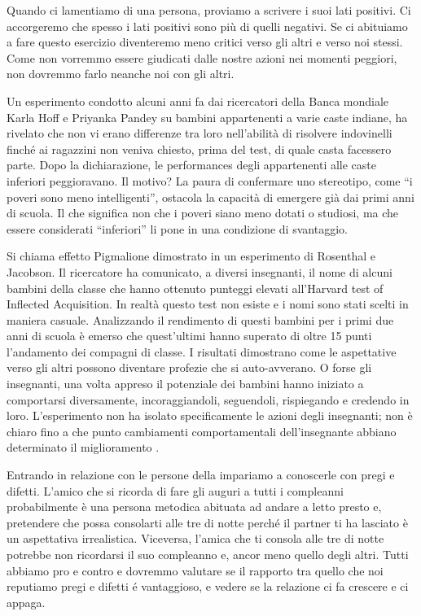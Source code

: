 \documentclass[12pt]{book} %
\begin{document}
Quando ci lamentiamo di una persona, proviamo a scrivere i suoi lati positivi. Ci accorgeremo che spesso i lati positivi
sono più di quelli negativi. Se ci abituiamo a fare questo esercizio diventeremo meno critici verso gli altri e verso
noi stessi. Come non vorremmo essere giudicati dalle nostre azioni nei momenti peggiori, non dovremmo farlo neanche noi
con gli altri.

Un esperimento condotto alcuni anni fa dai ricercatori della Banca mondiale Karla Hoff e Priyanka Pandey su bambini
appartenenti a varie caste indiane, ha rivelato che non vi erano differenze tra loro nell'abilità di risolvere
indovinelli finché ai ragazzini non veniva chiesto, prima del test, di quale casta facessero parte. Dopo la
dichiarazione, le performances degli appartenenti alle caste inferiori peggioravano. Il motivo? La paura di confermare
uno stereotipo, come “i poveri sono meno intelligenti”, ostacola la capacità di emergere già dai primi anni di scuola.
Il che significa non che i poveri siano meno dotati o studiosi, ma che essere considerati “inferiori” li pone in una
condizione di svantaggio. 

Si chiama effetto Pigmalione dimostrato in un esperimento di Rosenthal e Jacobson. Il ricercatore ha comunicato, a
diversi insegnanti, il nome di alcuni bambini della classe che hanno ottenuto punteggi elevati
all'Harvard test of Inflected Acquisition. In realtà questo test non esiste e i nomi sono stati
scelti in maniera casuale. Analizzando il rendimento di questi bambini per i primi due anni di scuola è emerso che
quest'ultimi hanno superato di oltre 15 punti l'andamento dei compagni di
classe. I risultati dimostrano come le aspettative verso gli altri possono diventare profezie che si auto-avverano. O
forse gli insegnanti, una volta appreso il potenziale dei bambini hanno iniziato a comportarsi diversamente,
incoraggiandoli, seguendoli, rispiegando e credendo in loro. L'esperimento non ha isolato specificamente le azioni degli insegnanti; non è chiaro fino a che punto cambiamenti comportamentali dell’insegnante abbiano determinato il miglioramento
.

Entrando in relazione con le persone della impariamo a conoscerle con pregi e difetti.
L'amico che si ricorda di fare gli auguri a tutti i compleanni probabilmente è una persona
metodica abituata ad andare a letto presto e, pretendere che possa consolarti alle tre di notte perché il partner ti ha
lasciato è un aspettativa irrealistica. Viceversa, l'amica che ti consola alle tre di notte
potrebbe non ricordarsi il suo compleanno e, ancor meno quello degli altri. Tutti abbiamo pro e contro e dovremmo
valutare se il rapporto tra quello che noi reputiamo pregi e difetti é vantaggioso, e vedere se la relazione ci fa crescere e ci appaga.
\end{document}
